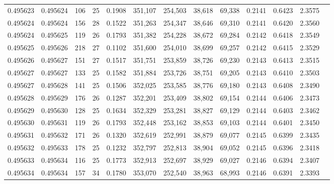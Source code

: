 \begin{tabular}{rrrrrrrrrrrrr}
0.495623 & 0.495624 & 106 &  25 &                                     0.1908 & 351,107 & 254,503 &  38,618 &  69,338 & 0.2141 & 0.6423 & 2.3575 \\
0.495624 & 0.495624 & 156 &  28 &                                     0.1522 & 351,263 & 254,347 &  38,646 &  69,310 & 0.2141 & 0.6420 & 2.3560 \\
0.495624 & 0.495625 & 119 &  26 &                                     0.1793 & 351,382 & 254,228 &  38,672 &  69,284 & 0.2142 & 0.6418 & 2.3549 \\
0.495625 & 0.495626 & 218 &  27 &                                     0.1102 & 351,600 & 254,010 &  38,699 &  69,257 & 0.2142 & 0.6415 & 2.3529 \\
0.495626 & 0.495627 & 151 &  27 &                                     0.1517 & 351,751 & 253,859 &  38,726 &  69,230 & 0.2143 & 0.6413 & 2.3515 \\
0.495627 & 0.495627 & 133 &  25 &                                     0.1582 & 351,884 & 253,726 &  38,751 &  69,205 & 0.2143 & 0.6410 & 2.3503 \\
0.495627 & 0.495628 & 141 &  25 &                                     0.1506 & 352,025 & 253,585 &  38,776 &  69,180 & 0.2143 & 0.6408 & 2.3490 \\
0.495628 & 0.495629 & 176 &  26 &                                     0.1287 & 352,201 & 253,409 &  38,802 &  69,154 & 0.2144 & 0.6406 & 2.3473 \\
0.495629 & 0.495630 & 128 &  25 &                                     0.1634 & 352,329 & 253,281 &  38,827 &  69,129 & 0.2144 & 0.6403 & 2.3462 \\
0.495630 & 0.495631 & 119 &  26 &                                     0.1793 & 352,448 & 253,162 &  38,853 &  69,103 & 0.2144 & 0.6401 & 2.3450 \\
0.495631 & 0.495632 & 171 &  26 &                                     0.1320 & 352,619 & 252,991 &  38,879 &  69,077 & 0.2145 & 0.6399 & 2.3435 \\
0.495632 & 0.495633 & 178 &  25 &                                     0.1232 & 352,797 & 252,813 &  38,904 &  69,052 & 0.2145 & 0.6396 & 2.3418 \\
0.495633 & 0.495634 & 116 &  25 &                                     0.1773 & 352,913 & 252,697 &  38,929 &  69,027 & 0.2146 & 0.6394 & 2.3407 \\
0.495634 & 0.495634 & 157 &  34 &                                     0.1780 & 353,070 & 252,540 &  38,963 &  68,993 & 0.2146 & 0.6391 & 2.3393 \\

\end{tabular}
